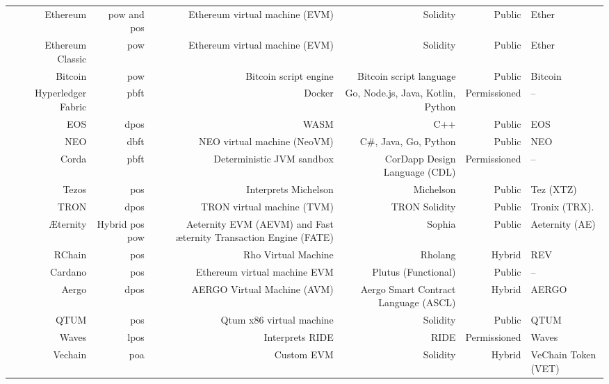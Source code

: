 \begin{landscape}
\begin{ThreePartTable}
\begin{center}
\begin{tabularx}{\linewidth}{cRRRRRl}
        \cite{ethereum} & Ethereum & \acrshort{pow} and \acrshort{pos} & Ethereum virtual machine (EVM) & Solidity & Public & Ether \\
        \cite{ethereumclassic} & Ethereum Classic & \acrshort{pow} & Ethereum virtual machine (EVM) & Solidity & Public & Ether \\
        \cite{bitcoin} & Bitcoin & \acrshort{pow} & Bitcoin script engine & Bitcoin script language & Public & Bitcoin \\
        \cite{hyperledger-fabric} & Hyperledger Fabric & \acrshort{pbft} & Docker & Go, Node.js, Java, Kotlin, Python & Permissioned & -- \\
        \cite{eos} & EOS & \acrshort{dpos} & WASM & C++ & Public & EOS \\
        \cite{neo} & NEO & \acrshort{dbft} & NEO virtual machine (NeoVM) & C\#, Java, Go, Python & Public & NEO \\
        \cite{corda} & Corda & \acrshort{pbft} & Deterministic JVM sandbox & CorDapp Design Language (CDL) & Permissioned & -- \\
        \cite{tezos} & Tezos & \acrshort{pos} & Interprets Michelson & Michelson & Public & Tez (XTZ) \\
        \cite{tron} & TRON & \acrshort{dpos} & TRON virtual machine (TVM) & TRON Solidity & Public & Tronix (TRX). \\
        \cite{aeternity} & Æternity & Hybrid \acrshort{pos} \acrshort{pow} & Aeternity EVM (AEVM) and Fast æternity Transaction Engine (FATE) & Sophia & Public & Aeternity (AE) \\
        \cite{rchain} & RChain & \acrshort{pos} & Rho Virtual Machine & Rholang & Hybrid & REV \\
        \cite{cardano} & Cardano & \acrshort{pos} & Ethereum virtual machine EVM & Plutus (Functional) & Public & -- \\
        \cite{aergo} & Aergo & \acrshort{dpos} & AERGO Virtual Machine (AVM) & Aergo Smart Contract Language (ASCL) & Hybrid & AERGO \\
        \cite{qtum} & QTUM & \acrshort{pos} & Qtum x86 virtual machine & Solidity & Public & QTUM \\
        \cite{waves} & Waves & \acrshort{lpos} & Interprets RIDE & RIDE & Permissioned & Waves \\
        \cite{vechain} & Vechain & \acrshort{poa} & Custom EVM & Solidity & Hybrid & VeChain Token (VET) \\

        \bottomrule
    \end{tabularx}
    \end{center}

\end{ThreePartTable}
\end{landscape}

